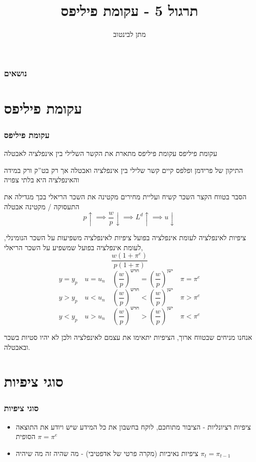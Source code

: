 \documentclass[10pt,usenames,dvipsnames]{beamer}
\title[עקומת פיליפס]{תרגול  5 - עקומת פיליפס}
\author{מתן לבינטוב}
\institute[{{ אב"ג}}]{{ אוניברסיטת בן גוריון בנגב}}
\date{}
\begin{document}
\begin{RTL}
\begin{frame}
\titlepage
\end{frame}
\begin{frame}
    \frametitle{נושאים}
    \tableofcontents
\end{frame}

\section{עקומת פיליפס}
\begin{frame}[allowframebreaks]
    \frametitle{עקומת פיליפס}
    \begin{block}{עקומת פיליפס}
        עקומת פיליפס מתארת את הקשר השלילי בין אינפלציה לאבטלה
    \end{block}

    \begin{exampleblock}{התיקון של פרידמן ופלפס}
        קיים קשר שלילי בין אינפלציה ואבטלה אך רק בט''ק ורק במידה והאינפלציה היא בלתי צפויה
    \end{exampleblock}
    \begin{block}{הסבר}
        בטווח הקצר השכר קשיח ועליית מחירים מקטינה את השכר הריאלי בכך מגדילה את התעסוקה / מקטינה אבטלה
        $$p \uparrow \implies \frac{w}{p} \downarrow \implies L^d \uparrow \implies u \downarrow$$
    \end{block}
    
    \framebreak

    \begin{block}{ציפיות לאינפלציה לעומת אינפלציה בפועל}
        ציפיות לאינפלציה משפיעות על השכר הנומינלי, לעומת אינפלציה בפועל שמשפיע על השכר הריאלי,
        $$\frac{w (1 + \pi^e)}{p (1 + \pi)}$$
        $$y = y_p \quad u = u_n \quad \left(\dfrac{w}{p}\right)^{\text{חדש}} = \left(\dfrac{w}{p}\right)^{\text{ישן}} \quad \pi = \pi^e$$
        $$y  > y_p \quad u < u_n \quad \left(\dfrac{w}{p}\right)^{\text{חדש}} < \left(\dfrac{w}{p}\right)^{\text{ישן}} \quad \pi > \pi^e$$
        $$y < y_p \quad u > u_n \quad \left(\dfrac{w}{p}\right)^{\text{חדש}} > \left(\dfrac{w}{p}\right)^{\text{ישן}} \quad \pi < \pi^e$$
    \end{block}

    אנחנו מניחים שבטווח ארוך, הציפיות יתאימו את עצמם לאינפלציה ולכן לא יהיו סטיות בשכר ובאבטלה.

\end{frame}

\section{סוגי ציפיות}
\begin{frame}
    \frametitle{סוגי ציפיות}
    \begin{itemize}
        \item ציפיות רציונליות - הציבור מתוחכם, לוקח בחשבון את כל המידע שיש ויודע את התוצאה הסופית $\pi = \pi ^ e$
        \item ציפיות נאיביות (מקרה פרטי של אדפטיבי) - מה שהיה זה מה שיהיה $\pi_t = \pi_{t-1}$
    \end{itemize}
    


\end{frame}
\end{RTL}
\end{document}
